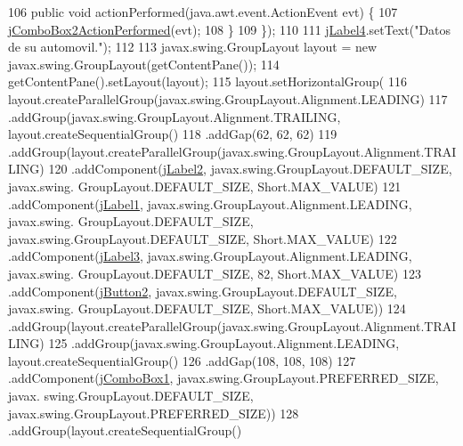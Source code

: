 \begin{DoxyCode}
106             \textcolor{keyword}{public} \textcolor{keywordtype}{void} actionPerformed(java.awt.event.ActionEvent evt) \{
107                 \mbox{\hyperlink{classejercicio2_1_1_automovil_interfaz_abe380cd2d77594984defa61f7adcbae2}{jComboBox2ActionPerformed}}(evt);
108             \}
109         \});
110 
111         \mbox{\hyperlink{classejercicio2_1_1_automovil_interfaz_a67df57d2820e5dcd5af770822ec0c59f}{jLabel4}}.setText(\textcolor{stringliteral}{"Datos de su automovil."});
112 
113         javax.swing.GroupLayout layout = \textcolor{keyword}{new} javax.swing.GroupLayout(getContentPane());
114         getContentPane().setLayout(layout);
115         layout.setHorizontalGroup(
116             layout.createParallelGroup(javax.swing.GroupLayout.Alignment.LEADING)
117             .addGroup(javax.swing.GroupLayout.Alignment.TRAILING, layout.createSequentialGroup()
118                 .addGap(62, 62, 62)
119                 .addGroup(layout.createParallelGroup(javax.swing.GroupLayout.Alignment.TRAILING)
120                     .addComponent(\mbox{\hyperlink{classejercicio2_1_1_automovil_interfaz_a70af4ec3e989a5ed4b835e00e84690c8}{jLabel2}}, javax.swing.GroupLayout.DEFAULT\_SIZE, javax.swing.
      GroupLayout.DEFAULT\_SIZE, Short.MAX\_VALUE)
121                     .addComponent(\mbox{\hyperlink{classejercicio2_1_1_automovil_interfaz_abccabae7351cdfccc4d45b6dc07461d1}{jLabel1}}, javax.swing.GroupLayout.Alignment.LEADING, javax.swing.
      GroupLayout.DEFAULT\_SIZE, javax.swing.GroupLayout.DEFAULT\_SIZE, Short.MAX\_VALUE)
122                     .addComponent(\mbox{\hyperlink{classejercicio2_1_1_automovil_interfaz_aa01e4eef9c730b99950e3bbce2ecd80d}{jLabel3}}, javax.swing.GroupLayout.Alignment.LEADING, javax.swing.
      GroupLayout.DEFAULT\_SIZE, 82, Short.MAX\_VALUE)
123                     .addComponent(\mbox{\hyperlink{classejercicio2_1_1_automovil_interfaz_ac92a1987525c5e7afa6eee2ae7d74787}{jButton2}}, javax.swing.GroupLayout.DEFAULT\_SIZE, javax.swing.
      GroupLayout.DEFAULT\_SIZE, Short.MAX\_VALUE))
124                 .addGroup(layout.createParallelGroup(javax.swing.GroupLayout.Alignment.TRAILING)
125                     .addGroup(javax.swing.GroupLayout.Alignment.LEADING, layout.createSequentialGroup()
126                         .addGap(108, 108, 108)
127                         .addComponent(\mbox{\hyperlink{classejercicio2_1_1_automovil_interfaz_af9e55c9052d02aceba060beb8283c4f2}{jComboBox1}}, javax.swing.GroupLayout.PREFERRED\_SIZE, javax.
      swing.GroupLayout.DEFAULT\_SIZE, javax.swing.GroupLayout.PREFERRED\_SIZE))
128                     .addGroup(layout.createSequentialGroup()

\end{DoxyCode}
